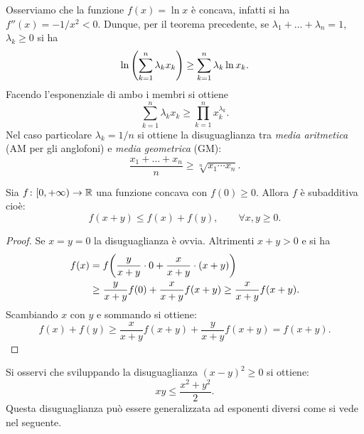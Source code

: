 \begin{example}
\mymark{*}
Osserviamo che la funzione $f(x) = \ln x$ è concava, infatti si ha
$f''(x) = -1/x^2 < 0$. Dunque, per il teorema precedente, se $\lambda_1 + \dots + \lambda_n =1$, $\lambda_k \ge 0$ si ha
\[
    \ln{\left( \sum_{k=1}^n \lambda_k x_k \right)}
    \ge \sum_{k=1}^n \lambda_k \ln x_k.
\]
Facendo l'esponenziale di ambo i membri si ottiene
\[
  \sum_{k=1}^n \lambda_k x_k \ge \prod_{k=1}^n x_k^{\lambda_k}.
\]
Nel caso particolare $\lambda_k = 1/n$ si ottiene
la disuguaglianza tra \emph{media aritmetica} (AM per gli anglofoni)
e \emph{media geometrica}
%
%
%
%
%
(GM):
\[
  \frac{x_1 + \dots + x_n}{n} \ge \sqrt[n]{x_1\cdots x_n}.
\]
\end{example}

\begin{exercise}
Sia $f\colon [0,+\infty) \to \mathbb R$ una funzione concava con $f(0)\ge 0$. Allora $f$ è subadditiva cioè:
\[
  f(x+y) \le f(x) + f(y),\qquad \forall x,y\ge 0.
\]
\end{exercise}
%
\begin{proof}
Se $x=y=0$ la disuguaglianza è ovvia.
Altrimenti $x+y>0$ e si ha
\begin{align*}
f(x) &= f{\left( \frac{y}{x+y}\cdot 0 + \frac{x}{x+y}\cdot (x+y) \right)}\\ &\ge \frac{y}{x+y}f(0) + \frac{x}{x+y}f(x+y)
\ge \frac{x}{x+y}f(x+y).
\end{align*}
Scambiando $x$ con $y$ e sommando si ottiene:
\[
  f(x) + f(y) \ge \frac{x}{x+y}f(x+y) + \frac{y}{x+y}f(x+y) = f(x+y).
\]
\end{proof}

Si osservi che sviluppando la disuguaglianza $(x-y)^2\ge 0$ si ottiene:
\[
  x y \le \frac{x^2 + y^2}{2}.
\]
Questa disuguaglianza può essere generalizzata ad esponenti diversi 
come si vede nel seguente.

